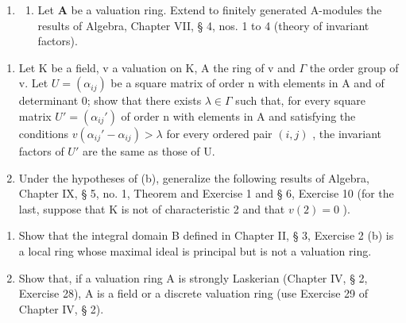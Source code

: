 \begin{enumerate}
\def\labelenumi{\arabic{enumi}.}
\setcounter{enumi}{5}
\tightlist
\item
  \begin{enumerate}
  \def\labelenumii{(\alph{enumii})}
  \tightlist
  \item
    Let \(\mathbf{A}\) be a valuation ring. Extend to finitely generated A-modules the results of Algebra, Chapter VII, § 4, nos. 1 to 4 (theory of invariant factors).
  \end{enumerate}
\end{enumerate}

\begin{enumerate}
\def\labelenumi{(\alph{enumi})}
\setcounter{enumi}{1}
\item
  Let K be a field, v a valuation on K, A the ring of v and \(\Gamma\) the order group of v. Let \(U = (\alpha_{ij})\) be a square matrix of order n with elements in A and of determinant 0; show that there exists \(\lambda \in \Gamma\) such that, for every square matrix \(U' = (\alpha_{ij}')\) of order n with elements in A and satisfying the conditions \(v(\alpha_{ij}' - \alpha_{ij}) > \lambda\) for every ordered pair \((i,j)\) , the invariant factors of \(U'\) are the same as those of U.
\item
  Under the hypotheses of (b), generalize the following results of Algebra, Chapter IX, § 5, no. 1, Theorem and Exercise 1 and § 6, Exercise 10 (for the last, suppose that K is not of characteristic 2 and that \(v(2) = 0\) ).
\end{enumerate}

\begin{enumerate}
\def\labelenumi{\arabic{enumi}.}
\setcounter{enumi}{6}
\item
  Show that the integral domain B defined in Chapter II, § 3, Exercise 2 (b) is a local ring whose maximal ideal is principal but is not a valuation ring.
\item
  Show that, if a valuation ring A is strongly Laskerian (Chapter IV, § 2, Exercise 28), A is a field or a discrete valuation ring (use Exercise 29 of Chapter IV, § 2).
\end{enumerate}
\relax{}
